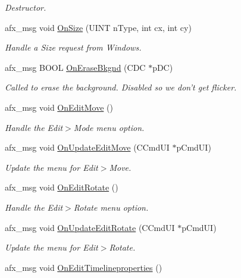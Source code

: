 \begin{DoxyCompactItemize}
\begin{DoxyCompactList}\small\item\em Destructor. \end{DoxyCompactList}\item 
afx\+\_\+msg void \hyperlink{class_c_main_frame_adf171bf1f2c6f10cc85dbe8db3fc93f7}{On\+Size} (U\+I\+N\+T n\+Type, int cx, int cy)
\begin{DoxyCompactList}\small\item\em Handle a Size request from Windows. \end{DoxyCompactList}\item 
afx\+\_\+msg B\+O\+O\+L \hyperlink{class_c_main_frame_a53a97f2229c5765329b2b59a21a54b0d}{On\+Erase\+Bkgnd} (C\+D\+C $\ast$p\+D\+C)
\begin{DoxyCompactList}\small\item\em Called to erase the background. Disabled so we don't get flicker. \end{DoxyCompactList}\item 
\hypertarget{class_c_main_frame_af07c2610f9f5631e7eb7374d10d5fdd3}{afx\+\_\+msg void \hyperlink{class_c_main_frame_af07c2610f9f5631e7eb7374d10d5fdd3}{On\+Edit\+Move} ()}\label{class_c_main_frame_af07c2610f9f5631e7eb7374d10d5fdd3}

\begin{DoxyCompactList}\small\item\em Handle the Edit$>$Mode menu option. \end{DoxyCompactList}\item 
afx\+\_\+msg void \hyperlink{class_c_main_frame_aadc40c4ab290da2368f6b87443f5ffbc}{On\+Update\+Edit\+Move} (C\+Cmd\+U\+I $\ast$p\+Cmd\+U\+I)
\begin{DoxyCompactList}\small\item\em Update the menu for Edit$>$Move. \end{DoxyCompactList}\item 
\hypertarget{class_c_main_frame_a00f10667f35de1fa6693c1bea941d878}{afx\+\_\+msg void \hyperlink{class_c_main_frame_a00f10667f35de1fa6693c1bea941d878}{On\+Edit\+Rotate} ()}\label{class_c_main_frame_a00f10667f35de1fa6693c1bea941d878}

\begin{DoxyCompactList}\small\item\em Handle the Edit$>$Rotate menu option. \end{DoxyCompactList}\item 
afx\+\_\+msg void \hyperlink{class_c_main_frame_af098b8129775d1b5fb47fcaaabce8c01}{On\+Update\+Edit\+Rotate} (C\+Cmd\+U\+I $\ast$p\+Cmd\+U\+I)
\begin{DoxyCompactList}\small\item\em Update the menu for Edit$>$Rotate. \end{DoxyCompactList}\item 
\hypertarget{class_c_main_frame_a73eb391d84e16eb934f2f66c1500af25}{afx\+\_\+msg void \hyperlink{class_c_main_frame_a73eb391d84e16eb934f2f66c1500af25}{On\+Edit\+Timelineproperties} ()}\label{class_c_main_frame_a73eb391d84e16eb934f2f66c1500af25}


\end{DoxyCompactItemize}
